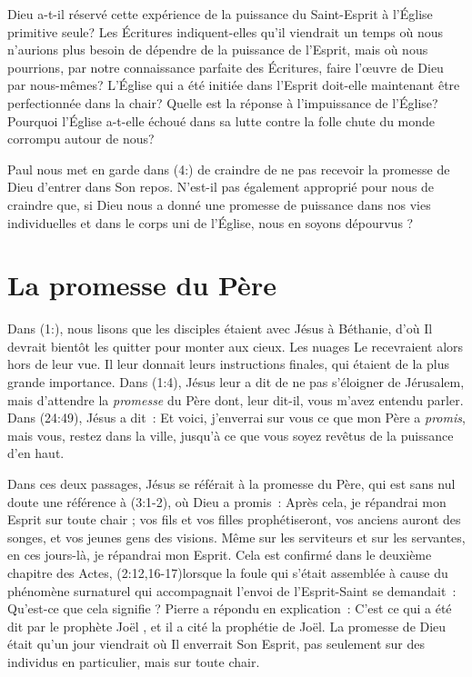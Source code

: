 Dieu a-t-il réservé cette expérience de la puissance du Saint-Esprit à
 l'Église primitive seule? Les Écritures indiquent-elles qu'il viendrait
 un temps où nous n'aurions plus besoin de dépendre de la puissance
 de l'Esprit, mais où nous pourrions, par notre connaissance parfaite
 des Écritures, faire l'œuvre de Dieu par nous-mêmes? L'Église qui a été
 initiée dans l'Esprit doit-elle maintenant être perfectionnée dans
 la chair?
 Quelle est la réponse à l'impuissance de l'Église?
 Pourquoi l'Église a-t-elle échoué dans sa lutte contre la folle chute
 du monde corrompu autour de nous?

Paul nous met en garde dans (4:) de craindre de ne pas
 recevoir la promesse de Dieu d'entrer dans Son repos.
 N'est-il pas également approprié pour nous de craindre que, si Dieu
 nous a donné une promesse de puissance dans nos vies individuelles et
 dans le corps uni de l'Église, nous en soyons dépourvus ?


\section{La promesse du P\`ere}

Dans (1:), nous lisons que les disciples étaient avec
 Jésus à Béthanie, d'où Il devrait bientôt les quitter pour monter
 aux cieux.
 Les nuages Le recevraient alors hors de leur vue.
 Il leur donnait leurs instructions finales, qui étaient de la plus
 grande importance.
 Dans (1:4), Jésus leur a dit de \Og ne pas s'éloigner
 de Jérusalem, mais d'attendre la \emph{promesse} du Père dont, leur dit-il,
 vous m'avez entendu parler. \Fg{}
 Dans (24:49), Jésus a dit~:
 \Og Et voici, j'enverrai sur vous ce que mon Père a \emph{promis}, mais vous,
 restez dans la ville, jusqu'à ce que vous soyez revêtus de la puissance
 d'en haut.\Fg{}

Dans ces deux passages, Jésus se référait à la promesse du Père, qui est
 sans nul doute une référence à (3:1-2), où Dieu a promis~:
 \Og Après cela, je répandrai mon Esprit sur toute chair ;
 vos fils et vos filles prophétiseront, vos anciens auront des songes,
 et vos jeunes gens des visions.
 Même sur les serviteurs et sur les servantes,
 en ces jours-là, je répandrai mon Esprit. \Fg{}
 Cela est confirmé dans le deuxième chapitre des Actes,
 (2:12,16-17)lorsque la foule qui
 s'était assemblée à cause du phénomène surnaturel qui accompagnait l'envoi
 de l'Esprit-Saint se demandait~:
 \Og Qu'est-ce que cela signifie ? \Fg{}
 Pierre a répondu en explication~:
 \Og C'est ce qui a été dit par le prophète Joël \Fg{},
 et il a cité la prophétie de Joël.
 La promesse de Dieu était qu'un jour viendrait où Il enverrait Son Esprit,
 pas seulement sur des individus en particulier, mais sur toute chair.

